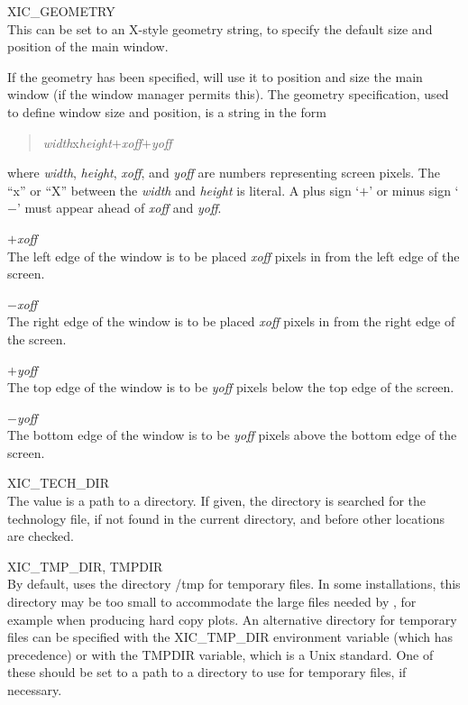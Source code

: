 \begin{description}
\item{\et XIC\_GEOMETRY}\\
This can be set to an X-style geometry string, to specify the 
default size and position of the {\Xic} main window.

If the geometry has been specified, {\Xic} will use it to position and
size the main window (if the window manager permits this).  The
geometry specification, used to define window size and position, is a
string in the form
\begin{quote}
{\it width\/}{\vt x}{\it height\/}$+${\it xoff\/}$+${\it yoff}
\end{quote}
where {\it width\/}, {\it height\/}, {\it xoff\/}, and {\it yoff} are
numbers representing screen pixels.  The ``{\vt x}'' or ``{\vt X}''
between the {\it width} and {\it height} is literal.  A plus sign
`$+$' or minus sign `$-$' must appear ahead of {\it xoff} and {\it
yoff}.

\begin{description}
\item{$+${\it xoff}}\\
The left edge of the window is to be placed {\it xoff} pixels in from
the left edge of the screen.

\item{$-${\it xoff}}\\
The right edge of the window is to be placed {\it xoff} pixels in from
the right edge of the screen.

\item{$+${\it yoff}}\\
The top edge of the window is to be {\it yoff} pixels below the top
edge of the screen.

\item{$-${\it yoff}}\\
The bottom edge of the window is to be {\it yoff} pixels above the
bottom edge of the screen.
\end{description}

\item{\et XIC\_TECH\_DIR}\\
The value is a path to a directory.  If given, the directory is
searched for the technology file, if not found in the current
directory, and before other locations are checked.

\item{{\et XIC\_TMP\_DIR}, {\et TMPDIR}}\\
By default, {\Xic} uses the directory {\vt /tmp} for temporary files. 
In some installations, this directory may be too small to accommodate
the large files needed by {\Xic}, for example when producing hard copy
plots.  An alternative directory for temporary files can be specified
with the {\et XIC\_TMP\_DIR} environment variable (which has
precedence) or with the {\et TMPDIR} variable, which is a Unix
standard.  One of these should be set to a path to a directory to use
for temporary files, if necessary.


\end{description}
